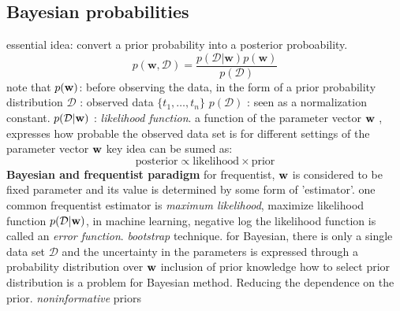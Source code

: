 \documentclass[a4paper]{book}
\begin{document}
\subsection{Bayesian probabilities}
essential idea: convert a prior probability into a posterior proboability.
\begin{equation}\label{eq1.1}
  p(\textbf{w},\mathcal{D}) = \frac{p(\mathcal{D}|\textbf {w})p(\textbf {w})}{p(\mathcal{D})}
\end{equation}
note that\newline
$p(\textbf w)$: before observing the data, in the form of a prior probability distribution\newline
$\mathcal{D}$ : observed data $\{t_1,\dots, t_n\}$\newline
$p(\mathcal{D})$ : seen as a normalization constant.\newline
$p(\mathcal{D}|\textbf w)$ : \emph{likelihood function}.  a function of the parameter vector $\textbf w$ , expresses how probable the observed data set is for different settings of the parameter vector $\textbf  w$
key idea can be sumed as:
\begin{equation}\label{eq1.2}
\mathrm{posterior} \propto \mathrm{likelihood} \times \mathrm{prior}
\end{equation}
\textbf{Bayesian and frequentist paradigm}
for frequentist, $\textbf  w$ is considered to be fixed parameter and its value is determined by some form of 'estimator'.\newline
one common frequentist estimator is \emph{maximum likelihood},  maximize likelihood function $p(\mathcal{D}|\textbf w)$, in machine learning, negative log the likelihood function is called an \emph{error function}.\newline
\emph{bootstrap} technique.\newline
for Bayesian, there is only a single data set $\mathcal{D}$ and the uncertainty in the parameters is expressed through a probability distribution over $\textbf w$\newline
inclusion of prior knowledge\newline
how to select prior distribution is a problem for Bayesian method.\newline
Reducing the dependence on the prior. \emph{noninformative} priors
\end{document}
